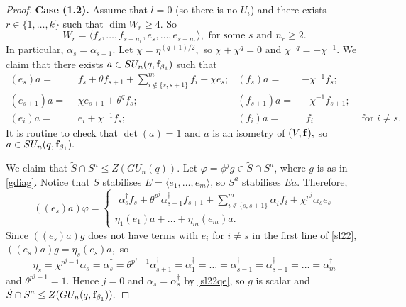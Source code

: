 \begin{proof}
\medskip


{\bf Case (1.2).} Assume that $l=0$ (so there is no $U_i$) and there exists $r \in \{1, \ldots, k\}$ such that $\dim W_r \ge 4$. So 
 $$W_r = \langle f_s, \ldots, f_{s+n_r}, e_{s}, \ldots, e_{s+n_r}\rangle,  \text{ for some } s \text{ and } n_r \ge 2.$$
In particular, $\alpha_s=\alpha_{s+1}.$ Let $\chi=\eta^{(q+1)/2},$ so $\chi +\chi^q=0$ and $\chi^{-q}=-\chi^{-1}.$ We claim that there exists  $a \in SU_n(q, {\bf f}_{\beta_1})$ such that 
\begin{align*}
(e_s)a= & \phantom{(} f_s + \theta f_{s+1} + \sum_{i \notin \{s,s+1\}}^m f_i + \chi e_s; & (f_s)a= & -\chi^{-1}f_s; & \\
(e_{s+1})a=  & \phantom{(} \chi e_{s+1} +\theta^q f_s; & (f_{s+1})a= & -\chi^{-1}f_{s+1}; & \\
(e_i)a= & \phantom{(} e_i+\chi^{-1} f_s; & (f_i)a= & \phantom{(} f_i &  \text{ for } i \ne s.
\end{align*}
It is routine to check that $\det(a)=1$ and $a$ is an isometry of $(V, {\bf f}),$ so $a \in SU_n(q,{\bf f}_{\beta_1}).$ 

We claim that $\tilde{S} \cap S^a \le Z(GU_n(q)).$ Let $\varphi= \phi^jg \in \tilde{S} \cap S^a$, where $g$ is as in \eqref{gdiag}. Notice that $S$ stabilises $E= \langle e_1, \ldots, e_m \rangle$, so $S^a$ stabilises  $Ea$. Therefore, 
\begin{equation}\label{sl22}
((e_s)a)\varphi=
\begin{cases}
\phantom{(} \alpha_s^{\dagger} f_s + \theta^{p^j} \alpha_{s+1}^{\dagger} f_{s+1} + \sum_{i \notin \{s,s+1\}}^m \alpha_i^{\dagger} f_i + \chi^{p^j} \alpha_s e_s\\
\eta_1 (e_1)a + \ldots + \eta_m (e_m)a.
\end{cases}
\end{equation}
Since $((e_s)a)g$ does not have terms with $e_i$ for $i \ne s$ in the first line of \eqref{sl22}, 
$((e_s)a)g=\eta_s(e_s)a,$ so 
\begin{equation}\label{sl22qe}
\eta_s=\chi^{p^j-1} \alpha_s=\alpha_s^{\dagger}=\theta^{p^j-1}\alpha_{s+1}^{\dagger} =\alpha_1^{\dagger} = \ldots= \alpha_{s-1}^{\dagger}  = \alpha_{s+1}^{\dagger} = \ldots = \alpha_m^{\dagger}
\end{equation}
and $\theta^{p^j-1}=1.$ Hence $j=0$ and $\alpha_s=\alpha_s^{\dagger}$ by \eqref{sl22qe}, so $g$ is scalar and $\tilde{S} \cap S^a\le Z(GU_n(q,{\bf f}_{\beta_1})).$


\end{proof}
